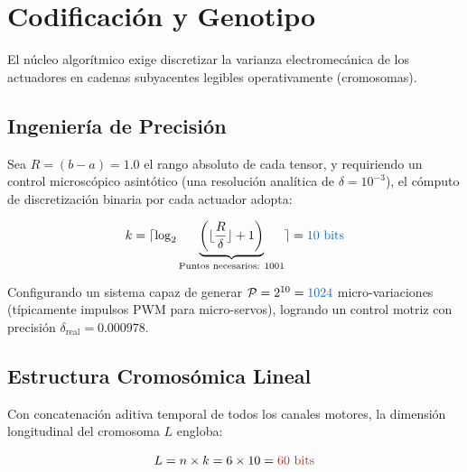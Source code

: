 \documentclass[11pt, a4paper, twocolumn]{article}
\begin{document}
\section{Codificación y Genotipo}

El núcleo algorítmico exige discretizar la varianza electromecánica de los actuadores en cadenas subyacentes legibles operativamente (cromosomas).

\subsection{Ingeniería de Precisión}
Sea $R = (b-a) = 1.0$ el rango absoluto de cada tensor, y requiriendo un control microscópico asintótico (una resolución analítica de $\delta = 10^{-3}$), el cómputo de discretización binaria por cada actuador adopta:

\begin{equation}
k = \lceil \log_2\underbrace{\left(\lfloor\frac{R}{\delta}\rfloor + 1\right)}_{\text{Puntos necesarios: } 1001} \rceil = \textcolor{coreblue}{10 \text{ bits}}
\end{equation}

Configurando un sistema capaz de generar $\mathcal{P} = 2^{10} = \textcolor{coreblue}{1024}$ micro-variaciones (típicamente impulsos PWM para micro-servos), logrando un control motriz con precisión  $\delta_{\text{real}} = 0.000978$. 

\subsection{Estructura Cromosómica Lineal}
Con concatenación aditiva temporal de todos los canales motores, la dimensión longitudinal del cromosoma $L$ engloba:

$$ L = n \times k = 6 \times 10 = \textcolor{corered}{60 \text{ bits}} $$

\begin{figure}[H]
    \centering
\end{figure}
\end{document}
